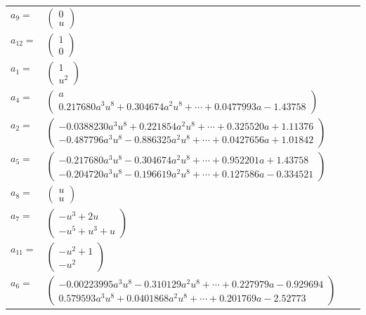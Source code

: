 \documentclass[1p]{elsarticle_modified}
\theoremstyle{definition}
\begin{document}
\begin{tabular}{m{7pt} m{180pt} m{7pt} m{180pt} }
\flushright $a_{9}=$&$\begin{pmatrix}0\\u\end{pmatrix}$ \\
\flushright $a_{12}=$&$\begin{pmatrix}1\\0\end{pmatrix}$ \\
\flushright $a_{1}=$&$\begin{pmatrix}1\\u^2\end{pmatrix}$ \\
\flushright $a_{4}=$&$\begin{pmatrix}a\\0.217680 a^{3} u^{8}+0.304674 a^{2} u^{8}+\cdots+0.0477993 a-1.43758\end{pmatrix}$ \\
\flushright $a_{2}=$&$\begin{pmatrix}-0.0388230 a^{3} u^{8}+0.221854 a^{2} u^{8}+\cdots+0.325520 a+1.11376\\-0.487796 a^{3} u^{8}-0.886325 a^{2} u^{8}+\cdots+0.0427656 a+1.01842\end{pmatrix}$ \\
\flushright $a_{5}=$&$\begin{pmatrix}-0.217680 a^{3} u^{8}-0.304674 a^{2} u^{8}+\cdots+0.952201 a+1.43758\\-0.204720 a^{3} u^{8}-0.196619 a^{2} u^{8}+\cdots+0.127586 a-0.334521\end{pmatrix}$ \\
\flushright $a_{8}=$&$\begin{pmatrix}u\\u\end{pmatrix}$ \\
\flushright $a_{7}=$&$\begin{pmatrix}- u^3+2 u\\- u^5+u^3+u\end{pmatrix}$ \\
\flushright $a_{11}=$&$\begin{pmatrix}- u^2+1\\- u^2\end{pmatrix}$ \\
\flushright $a_{6}=$&$\begin{pmatrix}-0.00223995 a^{3} u^{8}-0.310129 a^{2} u^{8}+\cdots+0.227979 a-0.929694\\0.579593 a^{3} u^{8}+0.0401868 a^{2} u^{8}+\cdots+0.201769 a-2.52773\end{pmatrix}$ \\

\end{tabular}
\end{document}
